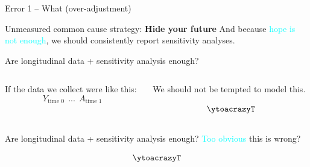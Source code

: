 \documentclass[
  ignorenonframetext,
  aspectratio=169,
]{beamer}
\begin{document}
\begin{frame}[fragile]{Error 1 -- What (over-adjustment)}
\begin{block}{Unmeasured common cause strategy: \textbf{Hide your
future}}
And because \textcolor{cyan}{hope is not enough}, we should consistently
report sensitivity analyses.
\end{block}

\begin{block}{Are longitudinal data + sensitivity analysis enough?}
\label{are-longitudinal-data-sensitivity-analysis-enough}
\begin{columns}[T]
\begin{column}{0.5\linewidth}
If the data we collect were like this:
\[Y_{\text{time 0}} ~~...~~ A_{\text{time 1}}\]
\end{column}

\begin{column}{0.5\linewidth}
We should not be tempted to model this.

\[\ytoacrazyT\]
\end{column}
\end{columns}
\end{block}

\begin{block}{Are longitudinal data + sensitivity analysis enough?}
\label{are-longitudinal-data-sensitivity-analysis-enough-1}
\textcolor{cyan}{Too obvious} this is wrong?

\[\ytoacrazyT\]
\end{block}
\end{frame}
\end{document}
